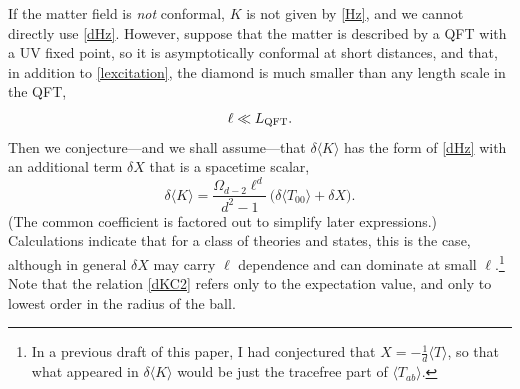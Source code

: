 \documentclass[aps,prd,twocolumn,showpacs,groupedaddress,nofootinbib,longbibliography]{revtex4-1}
\def\beq{\begin{equation}}
\def\eeq{\end{equation}}
\def\la{\langle}
\def\ra{\rangle}
\def\d{\delta}\def\D{\Delta}
\def\z{\zeta}
\def\O{\Omega}
\begin{document}
If the matter field is {\it not} conformal, $K$ is not given by \eqref{Hz}, and we cannot directly use \eqref{dHz}.
However, suppose that the matter is described by a QFT with a UV fixed point, so it is 
asymptotically conformal at short distances, and that, in addition to \eqref{lexcitation}, 
the diamond is much smaller than 
any length scale in the QFT, 
%
\beq
\ell\ll L_{\rm QFT}.
\eeq
%
Then we conjecture---and we shall assume---that $\d \la K\ra$ 
has the form of  \eqref{dHz} with an additional term $\d X$ that is a spacetime scalar,
%
\beq\label{dKC2}
\d \la K\ra =\frac{\O_{d-2} \ell^d }{d^2-1}\, \bigl(\d\la T_{00}\ra+\d X\bigr).
\eeq
%
(The common coefficient is factored out to simplify later expressions.)
Calculations \cite{Casini:2016rwj,Speranza:2016jwt} indicate that for a class of theories and states,
this is the case, although in general 
$\d X$ may carry $\ell$ dependence and can dominate at small $\ell$.\footnote{In 
a previous draft of this paper, I had conjectured that $X=-\frac1d \la T\ra$, 
so that what appeared in $\d\la K\ra$ would be just the tracefree part of $\la T_{ab}\ra$.} 
Note that the relation \eqref{dKC2} refers only to the expectation value, and only to 
lowest order in the radius of the ball.




\end{document}

